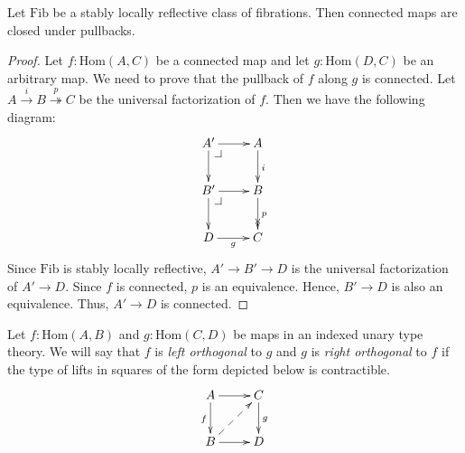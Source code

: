 \documentclass[reqno]{mscs}
\makeatletter
\newcommand{\fs}[1]{\mathrm{#1}}
\newcommand{\Hom}{\fs{Hom}}
\newcommand{\Fib}{\fs{Fib}}
\numberwithin{figure}{section}
\newcommand{\pb}[1][dr]{\save*!/#1-1.2pc/#1:(-1,1)@^{|-}\restore}
\makeatother
\begin{document}
\begin{lem}
Let $\Fib$ be a stably locally reflective class of fibrations.
Then connected maps are closed under pullbacks.
\end{lem}
\begin{proof}
Let $f : \Hom(A,C)$ be a connected map and let $g : \Hom(D,C)$ be an arbitrary map.
We need to prove that the pullback of $f$ along $g$ is connected.
Let $A \xrightarrow{i} B \overset{p}\twoheadrightarrow C$ be the universal factorization of $f$.
Then we have the following diagram:
\[ \xymatrix{ A' \ar[r] \ar[d] \pb  & A \ar[d]^i \\
              B' \ar[r] \ar[d] \pb  & B \ar@{->>}[d]^p \\
              D  \ar[r]_g           & C
            } \]
Since $\Fib$ is stably locally reflective, $A' \to B' \to D$ is the universal factorization of $A' \to D$.
Since $f$ is connected, $p$ is an equivalence.
Hence, $B' \to D$ is also an equivalence.
Thus, $A' \to D$ is connected.
\end{proof}

\begin{defn}
Let $f : \Hom(A,B)$ and $g : \Hom(C,D)$ be maps in an indexed unary type theory.
We will say that $f$ is \emph{left orthogonal} to $g$ and $g$ is \emph{right orthogonal} to $f$ if the type of lifts in squares of the form depicted below is contractible.
\[ \xymatrix{ A \ar[r] \ar[d]_f         & C \ar[d]^g \\
              B \ar[r] \ar@{-->}[ur]    & D
            } \]
\end{defn}
\end{document}
